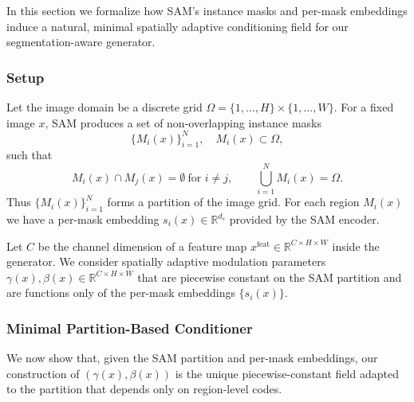 \documentclass[12pt]{article}
\begin{document}
In this section we formalize how SAM's instance masks and per-mask
embeddings induce a natural, minimal spatially adaptive conditioning
field for our segmentation-aware generator.

\subsubsection{Setup}

Let the image domain be a discrete grid
\(\Omega = \{1,\dots,H\} \times \{1,\dots,W\}\).
For a fixed image \(x\), SAM produces a set of non-overlapping
instance masks
\[
\{M_i(x)\}_{i=1}^N, \quad M_i(x) \subset \Omega,
\]
such that
\[
M_i(x) \cap M_j(x) = \emptyset \ \text{for } i \neq j,
\qquad
\bigcup_{i=1}^N M_i(x) = \Omega.
\]
Thus \(\{M_i(x)\}_{i=1}^N\) forms a partition of the image grid.
For each region \(M_i(x)\) we have a per-mask embedding
\(s_i(x) \in \mathbb{R}^{d_s}\) provided by the SAM encoder.

Let \(C\) be the channel dimension of a feature map
\(x^{\mathrm{feat}} \in \mathbb{R}^{C \times H \times W}\) inside the
generator.
We consider spatially adaptive modulation parameters
\(\gamma(x),\beta(x) \in \mathbb{R}^{C \times H \times W}\) that are
piecewise constant on the SAM partition and are functions only of the
per-mask embeddings \(\{s_i(x)\}\).

\subsubsection{Minimal Partition-Based Conditioner}

We now show that, given the SAM partition and per-mask embeddings, our
construction of \((\gamma(x),\beta(x))\) is the unique piecewise-constant
field adapted to the partition that depends only on region-level codes.
\end{document}
